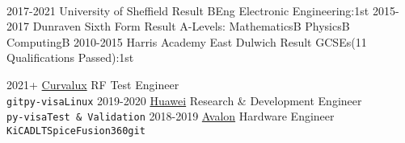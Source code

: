 \documentclass[9pt]{developercv} %
\begin{document}
\vspace{0.5cm}


\begin{minipage}[t]{0.35\textwidth}%

	\vspace{0.1cm} %
	\lorem \lorem \lorem \lorem \lorem\\ %
\end{minipage}
\hfill
\begin{minipage}[t]{0.60\textwidth}

	\vspace{0.1cm} %
	\halfentry
		{2017-2021}
		{University of Sheffield}
		{Result}
		{BEng Electronic Engineering:\hfill1st}
	\halfentry
		{2015-2017}
		{Dunraven Sixth Form}
		{Result}
		{
			A-Levels:\newline
			Mathematics\hfill B\newline
			Physics\hfill B\newline
			Computing\hfill B\newline
		}
	\halfentry
		{2010-2015}
		{Harris Academy East Dulwich}
		{Result}
		{GCSEs(11 Qualifications Passed):\hfill1st}
\end{minipage}




\begin{entrylist}
	\entry
		{2021+}
		{\href{https://Curvalux.com}{Curvalux}}
		{RF Test Engineer}
		{\lorem \lorem \lorem\\ \texttt{git}\slashsep\texttt{py-visa}\slashsep\texttt{Linux}}
	\entry
		{2019-2020}
		{\href{https://www.huawei.com/uk/contact-us}{Huawei}}
		{Research \& Development Engineer}
		{\lorem\lorem\\ \texttt{py-visa}\slashsep\texttt{Test \& Validation}}
	\entry
		{2018-2019}
		{\href{https://avalonrov.wixsite.com/avalonrov}{Avalon}}
		{Hardware Engineer}
		{\lorem\lorem\\ \texttt{KiCAD}\slashsep\texttt{LTSpice}\slashsep\texttt{Fusion360}\slashsep\texttt{git}}
\end{entrylist}
\end{document}
